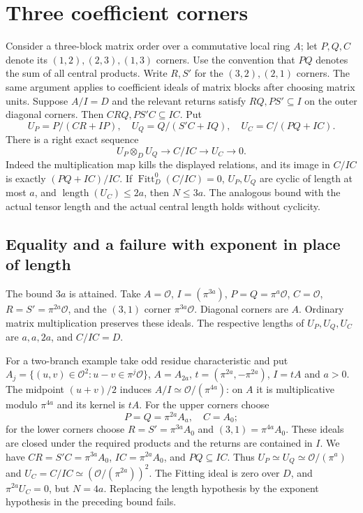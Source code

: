 \documentclass[11pt]{article}
\newcommand{\len}{\operatorname{length}}
\newcommand{\Fitt}{\operatorname{Fitt}}
\newcommand{\OO}{\mathcal O}
\begin{document}
\section{Three coefficient corners}
Consider a three-block matrix order over a commutative local ring $A$;
let $P,Q,C$ denote its $(1,2),(2,3),(1,3)$ corners. Use the convention
that $PQ$ denotes the sum of all central products. Write $R,S'$ for
the $(3,2),(2,1)$ corners. The same argument applies to coefficient
ideals of matrix blocks after choosing matrix units. Suppose $A/I=D$
and the relevant returns satisfy $RQ,PS'\subseteq I$ on the outer
diagonal corners. Then $CRQ,PS'C\subseteq IC$. Put
\[
 U_P=P/(CR+IP),\quad U_Q=Q/(S'C+IQ),\quad
 U_C=C/(PQ+IC).
\]
There is a right exact sequence
\[
 U_P\otimes_D U_Q\longrightarrow C/IC\longrightarrow U_C\longrightarrow0.
\]
Indeed the multiplication map kills the displayed relations, and its
image in $C/IC$ is exactly $(PQ+IC)/IC$. If $\Fitt_D^0(C/IC)=0$,
$U_P,U_Q$ are cyclic of length at most $a$, and $\len(U_C)\le2a$,
then $N\le3a$. The analogous bound with the actual tensor length and
the actual central length holds without cyclicity.

\subsection{Equality and a failure with exponent in place of length}
The bound $3a$ is attained. Take $A=\OO$, $I=(\pi^{3a})$,
$P=Q=\pi^a\OO$, $C=\OO$, $R=S'=\pi^{2a}\OO$, and the $(3,1)$
corner $\pi^{3a}\OO$. Diagonal corners are $A$. Ordinary matrix
multiplication preserves these ideals. The respective lengths of
$U_P,U_Q,U_C$ are $a,a,2a$, and $C/IC=D$.

For a two-branch example take odd residue characteristic and put
$A_j=\{(u,v)\in\OO^2:u-v\in\pi^j\OO\}$,
$A=A_{2a}$, $t=(\pi^{2a},-\pi^{2a})$, $I=tA$ and $a>0$.
The midpoint $(u+v)/2$ induces $A/I\simeq\OO/(\pi^{4a})$:
on $A$ it is multiplicative modulo $\pi^{4a}$ and its kernel
is $tA$. For the upper corners choose
\[
 P=Q=\pi^{2a} A_a,\quad C=A_0;
\]
for the lower corners choose $R=S'=\pi^{3a}A_0$ and
$(3,1)=\pi^{4a} A_0$. These ideals are closed under the required
products and the returns are contained in $I$. We have
$CR=S'C=\pi^{3a}A_0$, $IC=\pi^{2a}A_0$, and $PQ\subseteq IC$.
Thus $U_P\simeq U_Q\simeq\OO/(\pi^a)$ and
$U_C=C/IC\simeq(\OO/(\pi^{2a}))^2$. The Fitting ideal is zero
over $D$, and $\pi^{2a}U_C=0$, but $N=4a$. Replacing the length
hypothesis by the exponent hypothesis in the preceding bound fails.
\end{document}
